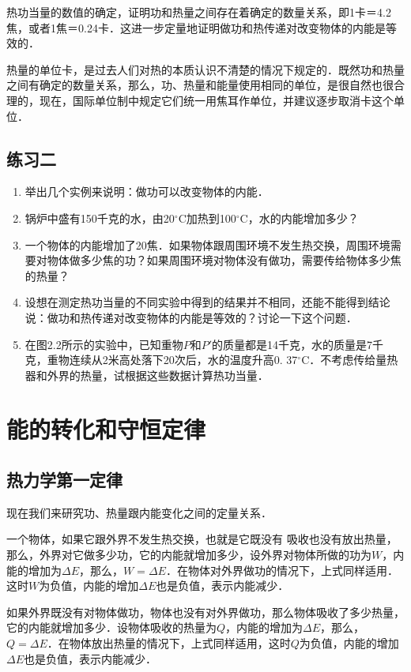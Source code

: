 热功当量的数值的确定，证明功和热量之间存在着确定的数量关系，即1卡＝4.2焦，或者1焦＝0.24卡．这进一步定量地证明做功和热传递对改变物体的内能是等效的．

热量的单位卡，是过去人们对热的本质认识不清楚的情况下规定的．既然功和热量之间有确定的数量关系，那么，功、热量和能量使用相同的单位，是很自然也很合理的，现在，国际单位制中规定它们统一用焦耳作单位，并建议逐步取消卡这个单位．

\subsection*{练习二}
\begin{enumerate}
\item 举出几个实例来说明：做功可以改变物体的内能．
\item 锅炉中盛有150千克的水，由20$^\circ$C加热到100$^\circ$C，水的内能增加多少？
\item 一个物体的内能增加了20焦．如果物体跟周围环境不发生热交换，周围环境需要对物体做多少焦的功？如果周围环境对物体没有做功，需要传给物体多少焦的热量？
\item 设想在测定热功当量的不同实验中得到的结果并不相同，还能不能得到结论说：做功和热传递对改变物体的内能是等效的？讨论一下这个问题．
\item 在图2.2所示的实验中，已知重物$P$和$P'$的质量都是14千克，水的质量是7千克，重物连续从2米高处落下20次后，水的温度升高0. 37$^\circ$C．不考虑传给量热器和外界的热量，试根据这些数据计算热功当量．
\end{enumerate}



\section{能的转化和守恒定律}
\subsection{热力学第一定律} 

现在我们来研究功、热量跟内能变化之间的定量关系．

一个物体，如果它跟外界不发生热交换，也就是它既没有
吸收也没有放出热量，那么，外界对它做多少功，它的内能就增加多少，设外界对物体所做的功为$W$，内能的增加为$\Delta E$，那么，$W=\Delta E$．在物体对外界做功的情况下，上式同样适用．这时$W$为负值，内能的增加$\Delta E$也是负值，表示内能减少．

如果外界既没有对物体做功，物体也没有对外界做功，那么物体吸收了多少热量，它的内能就增加多少．设物体吸收的热量为$Q$，内能的增加为$\Delta E$，那么，$Q=\Delta E$．在物体放出热量的情况下，上式同样适用，这时$Q$为负值，内能的增加$\Delta E$也是负值，表示内能减少．


